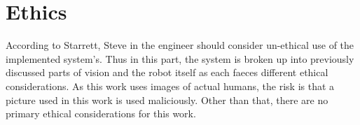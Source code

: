 \section{Ethics}
\label{sec:ethics}


According to Starrett, Steve in \cite{starrett2017engineering} the engineer should consider un-ethical use of the implemented system's.
Thus in this part, the system is broken up into previously discussed parts of vision and the robot itself as each faeces different ethical considerations.
As this work uses images of actual humans, the risk is that a picture used in this work is used maliciously.
Other than that, there are no primary ethical considerations for this work.